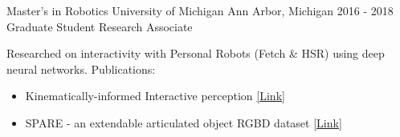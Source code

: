 

\begin{cventries2}
\cventry
{Master's in Robotics} %
{University of Michigan} %
{Ann Arbor, Michigan} %
{2016 - 2018} %
{}
\vspace{-0.3cm}
\cventry
{Graduate Student Research Associate} %
{} %
{} %
{} %
{
	\begin{cvitems} %
\item{
	Researched on interactivity with Personal Robots (Fetch \& HSR) using deep neural networks. Publications:
	\begin{itemize}
	\vspace{0.1cm}
	\item {Kinematically-informed Interactive perception
	\href{https://arxiv.org/pdf/1901.05580}{[Link]}}
	\vspace{0.1cm}
	\item SPARE - an extendable articulated object RGBD dataset {\href{https://arxiv.org/pdf/1803.11147}{[Link]}}
	\end{itemize}
	}
	\end{cvitems}
}


\end{cventries2}
